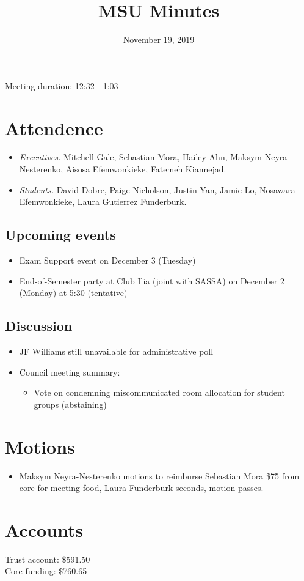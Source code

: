 \documentclass[12pt]{article}
\title{MSU Minutes}
\date{November 19, 2019}
\begin{document}
\maketitle

Meeting duration: 12:32 - 1:03

\section*{Attendence}
\begin{itemize}
\item \textit{Executives.} Mitchell Gale, Sebastian Mora, Hailey Ahn, Maksym Neyra-Nesterenko, Aisosa Efemwonkieke, Fatemeh Kiannejad.
\item \textit{Students.} David Dobre, Paige Nicholson, Justin Yan, Jamie Lo, Nosawara Efemwonkieke, Laura Gutierrez Funderburk.
\end{itemize}

\subsection*{Upcoming events}
\begin{itemize}
\item Exam Support event on December 3 (Tuesday)
\item End-of-Semester party at Club Ilia (joint with SASSA) on December 2 (Monday) at 5:30 (tentative)
\end{itemize}

\subsection*{Discussion}
\begin{itemize}
\item JF Williams still unavailable for administrative poll
\item Council meeting summary:
  \begin{itemize}
  \item Vote on condemning miscommunicated room allocation for student groups (abstaining)
  \end{itemize}
\end{itemize}

\section*{Motions}
\begin{itemize}
\item Maksym Neyra-Nesterenko motions to reimburse Sebastian Mora \$75 from core for meeting food, Laura Funderburk seconds, motion passes.
\end{itemize}

\section*{Accounts}

Trust account: \$591.50 \\ 
Core funding: \$760.65 \\
\end{document}
